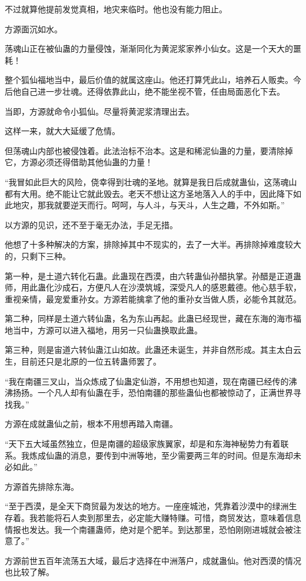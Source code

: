 \begin{this_body}
不过就算他提前发觉真相，地灾来临时。他也没有能力阻止。

方源面沉如水。

荡魂山正在被仙蛊的力量侵蚀，渐渐同化为黄泥浆家养小仙女。这是一个天大的噩耗！

整个狐仙福地当中，最后价值的就属这座山。他还打算凭此山，培养石人贩卖。今后他自己进一步壮魂。还得依靠此山，绝不能坐视不管，任由局面恶化下去。

当即，方源就命令小狐仙。尽量将黄泥浆清理出去。

这样一来，就大大延缓了危情。

但荡魂山内部也被侵蚀着。此法治标不治本。这是和稀泥仙蛊的力量，要清除掉它，方源必须还得借助其他仙蛊的力量！

“我冒如此巨大的风险，侥幸得到壮魂的圣地。就算是我日后成就蛊仙，这荡魂山都有大用。绝不能让它就此毁去。老天不想让这方圣地落入人的手中，因此降下如此地灾，那我就要逆天而行。呵呵，与人斗，与天斗，人生之趣，不外如斯。”

以方源的见识，还不至于毫无办法，手足无措。

他想了十多种解决的方案，排除掉其中不现实的，去了一大半。再排除掉难度较大的，只剩下三种。

第一种，是土道六转化石蛊。此蛊现在西漠，由六转蛊仙孙醋执掌。孙醋是正道蛊师，用此蛊化沙成石，方便凡人在沙漠筑城，深受凡人的感恩戴德。他心慈手软，重视亲情，最宠爱重孙女。方源若能擒拿了他的重孙女当做人质，必能令其就范。

第二种，同样是土道六转仙蛊，名为东山再起。此蛊已经现世，藏在东海的海市福地当中，方源可以进入福地，用另一只仙蛊换取此蛊。

第三种，则是宙道六转仙蛊江山如故。此蛊还未诞生，并非自然形成。其主太白云生，目前还只是北原的一位五转蛊师罢了。

“我在南疆三叉山，当众炼成了仙蛊定仙游，不用想也知道，现在南疆已经传的沸沸扬扬。一个凡人却有仙蛊在手，恐怕南疆的那些蛊仙也都被惊动了，正满世界寻找我。”

方源在成就蛊仙之前，根本不用想再踏入南疆。

“天下五大域虽然独立，但是南疆的超级家族翼家，却是和东海神秘势力有着联系。我炼成仙蛊的消息，要传到中洲等地，至少需要两三年的时间。但是东海却未必如此。”

方源首先排除东海。

“至于西漠，是全天下商贸最为发达的地方。一座座城池，凭靠着沙漠中的绿洲生存着。我若能将石人卖到那里去，必定能大赚特赚。可惜，商贸发达，意味着信息情报也发达。我一个南疆蛊师，绝对是个肥羊。到达那里，恐怕刚刚进城就会被注意了。”

方源前世五百年流荡五大域，最后才选择在中洲落户，成就蛊仙。他对西漠的情况也比较了解。


\end{this_body}

